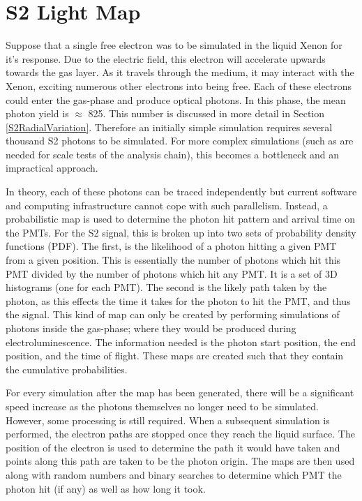 \section{S2 Light Map}
\par
Suppose that a single free electron was to be simulated in the liquid Xenon for it's response.
Due to the electric field, this electron will accelerate upwards towards the gas layer.
As it travels through the medium, it may interact with the Xenon, exciting numerous other electrons into being free.
Each of these electrons could enter the gas-phase and produce optical photons.
In this phase, the mean photon yield is $\approx$ 825.
This number is discussed in more detail in Section \ref{S2RadialVariation}.
Therefore an initially simple simulation requires several thousand S2 photons to be simulated.
For more complex simulations (such as are needed for scale tests of the analysis chain), this becomes a bottleneck and an impractical approach.

\par
In theory, each of these photons can be traced independently but current software and computing infrastructure cannot cope with such parallelism. 
Instead, a probabilistic map is used to determine the photon hit pattern and arrival time on the PMTs.
For the S2 signal, this is broken up into two sets of probability density functions (PDF).
The first, is the likelihood of a photon hitting a given PMT from a given position.
This is essentially the number of photons which hit this PMT divided by the number of photons which hit any PMT.
It is a set of 3D histograms (one for each PMT).
The second is the likely path taken by the photon, as this effects the time it takes for the photon to hit the PMT, and thus the signal.
This kind of map can only be created by performing simulations of photons inside the gas-phase; where they would be produced during electroluminescence. 
The information needed is the photon start position, the end position, and the time of flight.
These maps are created such that they contain the cumulative probabilities.

\par
For every simulation after the map has been generated, there will be a significant speed increase as the photons themselves no longer need to be simulated.
However, some processing is still required.
When a subsequent simulation is performed, the electron paths are stopped once they reach the liquid surface.
The position of the electron is used to determine the path it would have taken and points along this path are taken to be the photon origin. %
The maps are then used along with random numbers and binary searches to determine which PMT the photon hit (if any) as well as how long it took.

